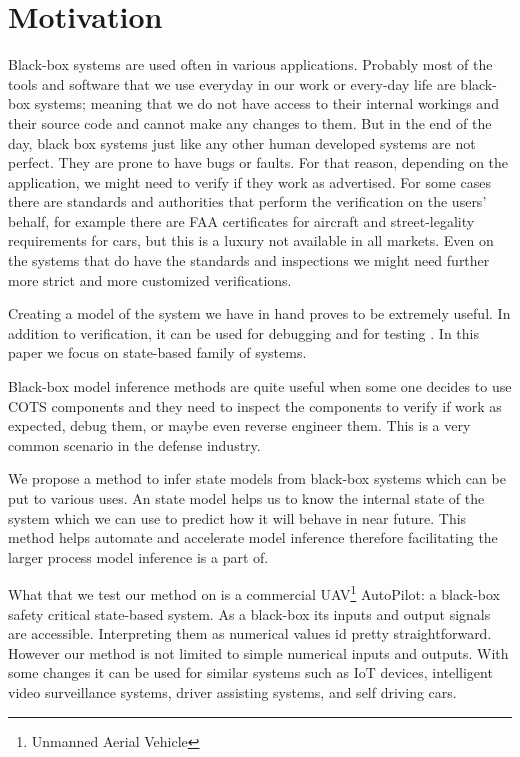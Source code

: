 \section{Motivation}
Black-box systems are used often in various applications. 
Probably most of the tools and software that we use everyday in our work or every-day life are black-box systems; meaning that we do not have access to their internal workings and their source code and cannot make any changes to them.
But in the end of the day, black box systems just like any other human developed systems are not perfect.
They are prone to have bugs or faults. For that reason, depending on the application, we might need to verify if they work as advertised. For some cases there are standards and authorities that perform the verification on the users' behalf, for example there are FAA certificates for aircraft and street-legality requirements for cars, but this is a luxury not available in all markets. Even on the systems that do have the standards and inspections we might need further more strict and more customized verifications.

Creating a model of the system we have in hand proves to be extremely useful. 
In addition to verification, it can be used for debugging \cite{jafar2019interactive, hybriddebugging, shang2013assisting} and for testing \cite{Walkinshaw2018TestingBlackBox, ModelBasedTesting, Papadopoulos2015, dallmeier2011automatically}.
In this paper we focus on state-based family of systems.


Black-box model inference methods are quite useful when some one decides to use COTS components and they need to inspect the components to verify if work as expected, debug them, or maybe even reverse engineer them. This is a very common scenario in the defense industry.

We propose a method to infer state models from black-box systems which can be put to various uses. An state model helps us to know the internal state of the system which we can use to predict how it will behave in near future.
This method helps automate and accelerate model inference therefore facilitating the larger process model inference is a part of. 


What that we test our method on is a commercial UAV\footnote{Unmanned Aerial Vehicle} AutoPilot: a black-box safety critical state-based system. As a black-box its inputs and output signals are accessible. Interpreting them as numerical values id pretty straightforward. However our method is not limited to simple numerical inputs and outputs. 
With some changes it can be used for similar systems such as IoT devices, intelligent video surveillance systems, driver assisting systems, and self driving cars.
